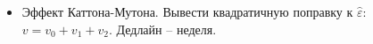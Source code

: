 


\begin{itemize}
    \item Эффект Каттона-Мутона. Вывести квадратичную поправку к $\hat{\varepsilon}$: $v = v_0 + v_1 + v_2$. Дедлайн -- неделя.
\end{itemize}
